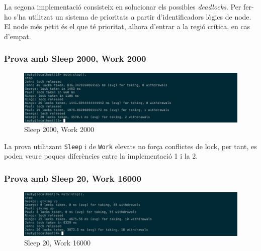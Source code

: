 \documentclass[a4paper, 11pt]{article}
\begin{document}
La segona implementació consisteix en solucionar els possibles \emph{deadlocks}.
Per fer-ho s'ha utilitzat un sistema de prioritats a partir d'identificadors
lògics de node. El node més petit és el que té prioritat, alhora d'entrar a la
regió crítica, en cas d'empat.

\subsubsection{Prova amb Sleep 2000, Work 2000}

\begin{figure}[H]
    \centering
    \includegraphics[width=1.0\textwidth]{figures/2000-2000lock2}
    \caption{Sleep 2000, Work 2000 \label{fig:2000-2000lock2}}    
\end{figure}

La prova utilitzant \texttt{Sleep} i de \texttt{Work} elevats no força conflictes de lock, per tant, es poden veure poques diferències entre la implementació 1 i la 2.

\subsubsection{Prova amb Sleep 20, Work 16000}

\begin{figure}[H]
    \centering
    \includegraphics[width=1.0\textwidth]{figures/20-16000lock2}
    \caption{Sleep 20, Work 16000 \label{fig:20-16000lock2}}    
\end{figure}
\end{document}
